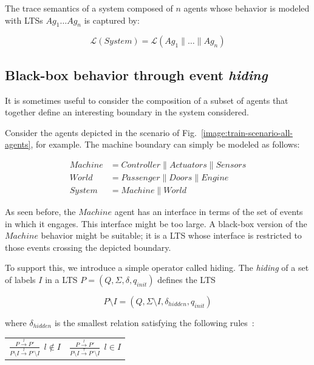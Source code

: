 The trace semantics of a system composed of $n$ agents whose behavior is modeled with LTSs $Ag_1 \ldots Ag_n$ is captured by:

\begin{equation}
\mathcal{L}(System) = \mathcal{L}(Ag_1 \parallel \ldots \parallel Ag_n)
\label{equation:system-composition}
\end{equation}


\subsection{Black-box behavior through event \emph{hiding}}

It is sometimes useful to consider the composition of a subset of agents that together define an interesting boundary in the system considered. 

Consider the agents depicted in the scenario of Fig.~\ref{image:train-scenario-all-agents}, for example. The machine boundary can simply be modeled as follows:

\vspace{-0.8cm}
\begin{align}
Machine &= Controller \parallel Actuators \parallel Sensors \\
World   &= Passenger \parallel Doors \parallel Engine \\
System  &= Machine \parallel World
\end{align}
\vspace{-0.8cm}

As seen before, the $Machine$ agent has an interface in terms of the set of events in which it engages. This interface might be too large. A black-box version of the $Machine$ behavior might be suitable; it is a LTS whose interface is restricted to those events crossing the depicted boundary. 

To support this, we introduce a simple operator called hiding. The \emph{hiding} of a set of labels $I$ in a LTS $P = (Q,\Sigma,\delta,q_{init})$ defines the LTS

\begin{equation}
P \setminus I = (Q,\Sigma \setminus I,\delta_{hidden},q_{init})
\end{equation}

\noindent where $\delta_{hidden}$ is the smallest relation satisfying the following rules~\cite{Giannakopoulou:1999}:

\begin{center}
\begin{tabular}{cc}
$\frac{\displaystyle P \stackrel{l}{\longrightarrow} P'}{\displaystyle P \setminus I \stackrel{l}{\longrightarrow} P' \setminus I}~~l \notin I$ & 
$\frac{\displaystyle P \stackrel{l}{\longrightarrow} P'}{\displaystyle P \setminus I \stackrel{\tau}{\longrightarrow} P' \setminus I}~~l \in I$ \\
\end{tabular}
\end{center}

